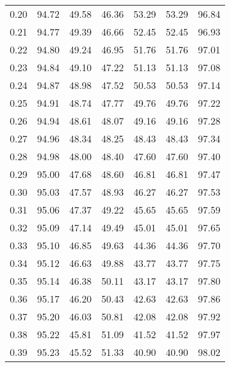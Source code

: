\begin{tabular}{|c|c|c|c|c|c|c|}
      0.20 &     94.72 &     49.58 &      46.36 &   53.29 &      53.29 &         96.84 \\
      0.21 &     94.77 &     49.39 &      46.66 &   52.45 &      52.45 &         96.93 \\
      0.22 &     94.80 &     49.24 &      46.95 &   51.76 &      51.76 &         97.01 \\
      0.23 &     94.84 &     49.10 &      47.22 &   51.13 &      51.13 &         97.08 \\
      0.24 &     94.87 &     48.98 &      47.52 &   50.53 &      50.53 &         97.14 \\
      0.25 &     94.91 &     48.74 &      47.77 &   49.76 &      49.76 &         97.22 \\
      0.26 &     94.94 &     48.61 &      48.07 &   49.16 &      49.16 &         97.28 \\
      0.27 &     94.96 &     48.34 &      48.25 &   48.43 &      48.43 &         97.34 \\
      0.28 &     94.98 &     48.00 &      48.40 &   47.60 &      47.60 &         97.40 \\
      0.29 &     95.00 &     47.68 &      48.60 &   46.81 &      46.81 &         97.47 \\
      0.30 &     95.03 &     47.57 &      48.93 &   46.27 &      46.27 &         97.53 \\
      0.31 &     95.06 &     47.37 &      49.22 &   45.65 &      45.65 &         97.59 \\
      0.32 &     95.09 &     47.14 &      49.49 &   45.01 &      45.01 &         97.65 \\
      0.33 &     95.10 &     46.85 &      49.63 &   44.36 &      44.36 &         97.70 \\
      0.34 &     95.12 &     46.63 &      49.88 &   43.77 &      43.77 &         97.75 \\
      0.35 &     95.14 &     46.38 &      50.11 &   43.17 &      43.17 &         97.80 \\
      0.36 &     95.17 &     46.20 &      50.43 &   42.63 &      42.63 &         97.86 \\
      0.37 &     95.20 &     46.03 &      50.81 &   42.08 &      42.08 &         97.92 \\
      0.38 &     95.22 &     45.81 &      51.09 &   41.52 &      41.52 &         97.97 \\
      0.39 &     95.23 &     45.52 &      51.33 &   40.90 &      40.90 &         98.02 \\

\end{tabular}
